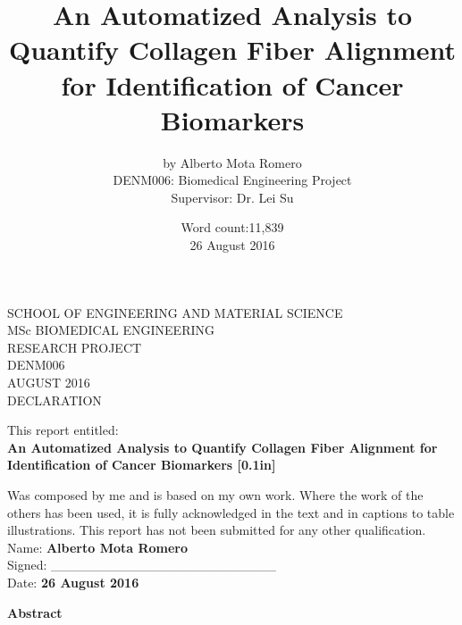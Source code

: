\documentclass[12pt,a4paper]{article}
\begin{document}
\renewcommand{\baselinestretch}{1.50}\normalsize


\title{ An Automatized Analysis to Quantify Collagen Fiber Alignment for Identification of Cancer Biomarkers }
\author{by Alberto Mota Romero \\DENM006: Biomedical Engineering Project \\Supervisor: Dr. Lei Su}

\date{Word count:11,839 \\26 August 2016}
\maketitle
\thispagestyle{empty}

\newpage\null\thispagestyle{empty}\newpage

\newpage
\begin{center}
SCHOOL OF ENGINEERING AND MATERIAL SCIENCE \\[0.3in]

MSc BIOMEDICAL ENGINEERING \\
RESEARCH PROJECT \\
DENM006\\[0.3in]
AUGUST 2016\\[0.3in]
DECLARATION\\[0.5in]
\end{center}

This report entitled:\\[0.1in]

\textbf{An Automatized Analysis to Quantify Collagen Fiber Alignment for Identification of Cancer Biomarkers [0.1in]}

Was composed by me and is based on my own work. Where the work of the others has been used, it is fully acknowledged in the text and in captions to table illustrations. This report has not been submitted for any other qualification.\\

Name: \textbf{Alberto Mota Romero} \\

Signed: \_\_\_\_\_\_\_\_\_\_\_\_\_\_\_\_\_\_\_\_\_\_\_\_ \\

Date: \textbf{26 August 2016}

\thispagestyle{empty}
\newpage

\newpage\null\thispagestyle{empty}\newpage

\LARGE\textbf{Abstract}\\[0.1in]
\normalsize
\end{document}
